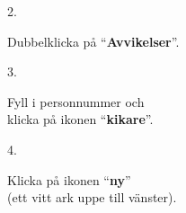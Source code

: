 \documentclass[paper=a5,DIV=15,headinclude,twoside=semi,openany,titlepage=firstiscover]{scrbook}
\begin{document}
\noindent\hrulefill

\vfill
\noindent
\begin{minipage}[t]{0.06\textwidth}
\phantom{1}2.
\end{minipage}%
\begin{minipage}[t]{.49\textwidth}
	Dubbelklicka på ``\textbf{Avvikelser}''.
\end{minipage}%
\begin{minipage}[t]{.45\textwidth}
	\hfill{}
\end{minipage}
\vfill

\noindent\hrulefill

\vfill
\noindent
\begin{minipage}[t]{0.06\textwidth}
	\phantom{1}3.
\end{minipage}%
\begin{minipage}[t]{.44\textwidth}
	Fyll i personnummer och\\ klicka på ikonen ``\textbf{kikare}''.
\end{minipage}%
\begin{minipage}[t]{.5\textwidth}
	\hfill{}
\end{minipage}
\vfill

\noindent\hrulefill

\vfill
\noindent
\begin{minipage}[t]{0.06\textwidth}
	\phantom{1}4.
\end{minipage}%
\begin{minipage}[t]{.44\textwidth}
	Klicka på ikonen ``\textbf{ny}''\\(ett vitt ark uppe till vänster).
\end{minipage}%
\begin{minipage}[t]{.5\textwidth}
	\hfill{}
\end{minipage}
\vfill
\end{document}
